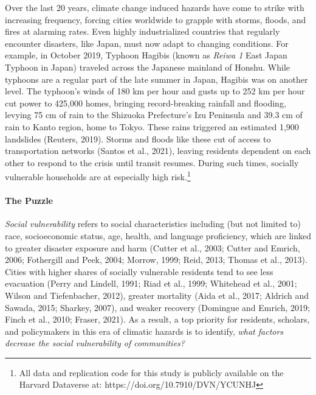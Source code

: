 \documentclass[]{elsarticle} %
\begin{document}
Over the last 20 years, climate change induced hazards have come to
strike with increasing frequency, forcing cities worldwide to grapple
with storms, floods, and fires at alarming rates. Even highly
industrialized countries that regularly encounter disasters, like Japan,
must now adapt to changing conditions. For example, in October 2019,
Typhoon Hagibis (known as \emph{Reiwa 1} East Japan Typhoon in Japan)
traveled across the Japanese mainland of Honshu. While typhoons are a
regular part of the late summer in Japan, Hagibis was on another level.
The typhoon's winds of 180 km per hour and gusts up to 252 km per hour
cut power to 425,000 homes, bringing record-breaking rainfall and
flooding, levying 75 cm of rain to the Shizuoka Prefecture's Izu
Peninsula and 39.3 cm of rain to Kanto region, home to Tokyo. These
rains triggered an estimated 1,900 landslides (Reuters, 2019). Storms
and floods like these cut of access to transportation networks (Santos
et al., 2021), leaving residents dependent on each other to respond to
the crisis until transit resumes. During such times, socially vulnerable
households are at especially high risk.\footnote{All data and
  replication code for this study is publicly available on the Harvard
  Dataverse at: https://doi.org/10.7910/DVN/YCUNHJ}

\hypertarget{the-puzzle}{%
\paragraph{The Puzzle}\label{the-puzzle}}

\emph{Social vulnerability} refers to social characteristics including
(but not limited to) race, socioeconomic status, age, health, and
language proficiency, which are linked to greater disaster exposure and
harm (Cutter et al., 2003; Cutter and Emrich, 2006; Fothergill and Peek,
2004; Morrow, 1999; Reid, 2013; Thomas et al., 2013). Cities with higher
shares of socially vulnerable residents tend to see less evacuation
(Perry and Lindell, 1991; Riad et al., 1999; Whitehead et al., 2001;
Wilson and Tiefenbacher, 2012), greater mortality (Aida et al., 2017;
Aldrich and Sawada, 2015; Sharkey, 2007), and weaker recovery (Domingue
and Emrich, 2019; Finch et al., 2010; Fraser, 2021). As a result, a top
priority for residents, scholars, and policymakers in this era of
climatic hazards is to identify, \emph{what factors decrease the social
vulnerability of communities?}
\end{document}
